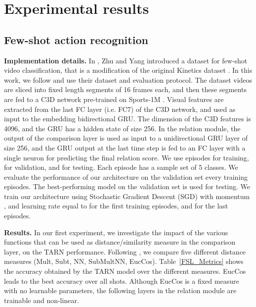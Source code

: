 \section{Experimental results}
\label{Exp_results}
\subsection{Few-shot action recognition}



\textbf{Implementation details.}  In \cite{zhu_18_compound}, Zhu and Yang introduced a dataset for few-shot video classification, that is a modification of the original Kinetics dataset \cite{kay_17_kinetics}. In this work, we follow \cite{zhu_18_compound} and use their dataset and evaluation protocol. The dataset videos are sliced into fixed length segments of 16 frames each, and then these segments are fed to a C3D network pre-trained on Sports-1M \cite{karpathy_14_sports1m}. Visual features are extracted from the last FC layer (i.e. FC7) of the C3D network, and used as input to the embedding bidirectional GRU. The dimension of the C3D features is 4096, and the GRU has a hidden state of size 256. In the relation module, the output of the comparison layer is used as input to a unidirectional GRU layer of size 256, and the GRU output at the last time step is fed to an FC layer with a single neuron for predicting the final relation score. We use  episodes for training,  for validation, and  for testing. Each episode has a sample set of 5 classes. We evaluate the performance of our architecture on the validation set every  training episodes. The best-performing model on the validation set is used for testing. We train our architecture using Stochastic Gradient Descent (SGD) with momentum , and learning rate equal to  for the first  training episodes, and  for the last  episodes.







\textbf{Results.} In our first experiment, we investigate the impact of the various functions that can be used as distance/similarity measure in the comparison layer, on the TARN performance. Following \cite{wang_17_match}, we compare five different distance measures (Mult, Subt, NN, SubMultNN, EucCos). Table~\ref{FSL_Metrics} shows the accuracy obtained by the TARN model over the different measures. EucCos leads to the best accuracy over all shots. Although EucCos is a fixed measure with no learnable parameters, the following layers in the relation module are trainable and non-linear.





